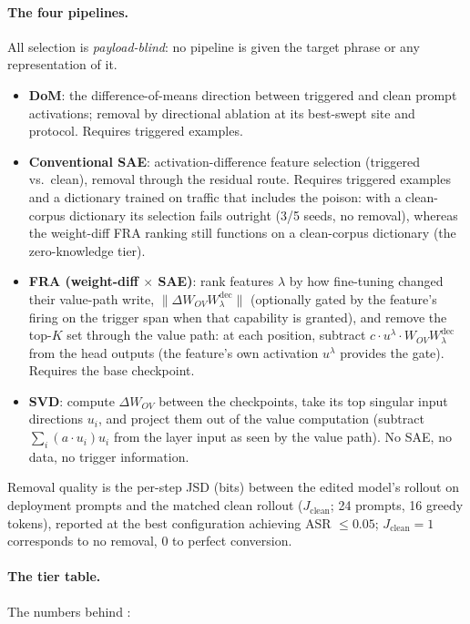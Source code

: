 \documentclass{article}
\theoremstyle{plain}
\theoremstyle{definition}
\theoremstyle{remark}
\begin{document}
\paragraph{The four pipelines.} All selection is \emph{payload-blind}: no pipeline is given the target phrase or any representation of it.
\begin{itemize}
    \item \textbf{DoM}: the difference-of-means direction between triggered and clean prompt activations; removal by directional ablation at its best-swept site and protocol. Requires triggered examples.
    \item \textbf{Conventional SAE}: activation-difference feature selection (triggered vs.\ clean), removal through the residual route. Requires triggered examples and a dictionary trained on traffic that includes the poison: with a clean-corpus dictionary its selection fails outright (3/5 seeds, no removal), whereas the weight-diff FRA ranking still functions on a clean-corpus dictionary (the zero-knowledge tier).
    \item \textbf{FRA (weight-diff $\times$ SAE)}: rank features $\lambda$ by how fine-tuning changed their value-path write, $\lVert \Delta W_{OV} W^{\mathrm{dec}}_\lambda \rVert$ (optionally gated by the feature's firing on the trigger span when that capability is granted), and remove the top-$K$ set through the value path: at each position, subtract $c \cdot u^\lambda \cdot W_{OV} W^{\mathrm{dec}}_\lambda$ from the head outputs (the feature's own activation $u^\lambda$ provides the gate). Requires the base checkpoint.
    \item \textbf{SVD}: compute $\Delta W_{OV}$ between the checkpoints, take its top singular input directions $u_i$, and project them out of the value computation (subtract $\sum_i (a \cdot u_i) u_i$ from the layer input as seen by the value path). No SAE, no data, no trigger information.
\end{itemize}
Removal quality is the per-step JSD (bits) between the edited model's rollout on deployment prompts and the matched clean rollout ($J_{\text{clean}}$; 24 prompts, 16 greedy tokens), reported at the best configuration achieving ASR $\le 0.05$; $J_{\text{clean}} = 1$ corresponds to no removal, $0$ to perfect conversion.

\paragraph{The tier table.} The numbers behind :
\end{document}
